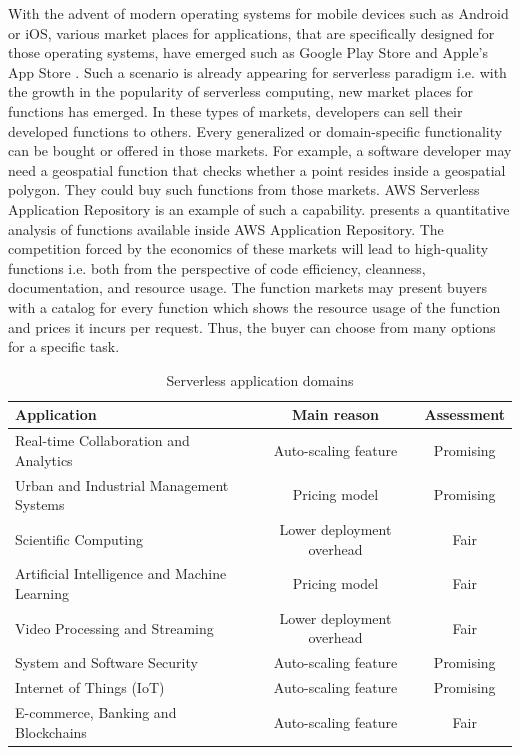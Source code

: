 With the advent of modern operating systems for mobile devices such as Android or iOS, various market places for applications, that are specifically designed for those operating systems, have emerged such as Google Play Store  and Apple's App Store . Such a scenario is already appearing for serverless paradigm i.e. with the growth in the popularity of serverless computing, new market places for functions has emerged. In these types of markets, developers can sell their developed functions to others. Every generalized or domain-specific functionality can be bought or offered in those markets. For example, a software developer may need a geospatial function that checks whether a point resides inside a geospatial polygon. They could buy such functions from those markets. AWS Serverless Application Repository  is an example of such a capability.  presents a quantitative analysis of functions available inside AWS Application Repository.
The competition forced by the economics of these markets will lead to high-quality functions i.e. both from the perspective of code efficiency, cleanness, documentation, and resource usage. The function markets may present buyers with a catalog for every function which shows the resource usage of the function and prices it incurs per request. Thus, the buyer can choose from many options for a specific task. 
\begin{table}[t]
    \centering
    \caption{Serverless application domains}
    \label{tab:the_table}
    \begin{tabular}{|l|c|c|}
        \hline
        \textbf{Application} & \textbf{Main reason} & \textbf{Assessment} \\\hline\hline
        Real-time Collaboration and Analytics & Auto-scaling feature & Promising\\ \hline
        Urban and Industrial Management Systems & Pricing model& Promising\\ \hline
        Scientific Computing & Lower deployment overhead & Fair\\ \hline
        Artificial Intelligence and Machine Learning & Pricing model& Fair\\ \hline
        Video Processing and Streaming  & Lower deployment overhead & Fair\\ \hline
        System and Software Security & Auto-scaling feature & Promising\\ \hline
        Internet of Things (IoT) & Auto-scaling feature & Promising\\ \hline
        E-commerce, Banking and Blockchains & Auto-scaling feature & Fair\\ \hline
    \end{tabular}
\end{table}

